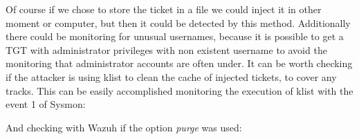 Of course if we chose to store the ticket in a file we could inject it in other moment or computer, but then it could be detected by this method.
\linej
\linej
Additionally there could be monitoring for unusual usernames, because it is possible to get a TGT with administrator privileges with non existent username to avoid the monitoring that administrator accounts are often under.
\linej
\linej
It can be worth checking if the attacker is using klist to clean the cache of injected tickets, to cover any tracks. This can be easily accomplished monitoring the execution of klist with the event 1 of Sysmon:

\linej
And checking with Wazuh if the option \textit{purge} was used:


